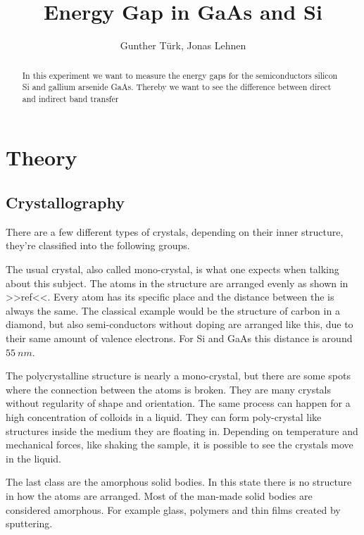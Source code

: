 \documentclass[]{article}
\title{Energy Gap in GaAs and Si}
\author{Gunther T\"urk, Jonas Lehnen}
\begin{document}
\maketitle
\begin{abstract}
In this experiment we want to measure the energy gaps for the semiconductors silicon Si and gallium arsenide GaAs. Thereby we want to see the difference between direct and indirect band transfer

\end{abstract}

\tableofcontents


\section{Theory}
\subsection{Crystallography}
There are a few different types of crystals, depending on their inner structure, they're classified into the following groups. 

The usual crystal, also called mono-crystal, is what one expects when talking about this subject. The atoms in the structure are arranged evenly as shown in >>ref<<. Every atom has its specific place and the distance between the is always the same. The classical example would be the structure of carbon in a diamond, but also semi-conductors without doping are arranged like this, due to their same amount of valence electrons. For Si and GaAs this distance is around $55\ nm$.

The polycrystalline structure is nearly a mono-crystal, but there are some spots where the connection between the atoms is broken. They are many crystals without regularity of shape and orientation. The same process can happen for a high concentration of colloids in a liquid. They can form poly-crystal like structures inside the medium they are floating in. Depending on temperature and mechanical forces, like shaking the sample, it is possible to see the crystals move in the liquid.


The last class are the amorphous solid bodies. In this state there is no structure in how the atoms are arranged. Most of the man-made solid bodies are considered amorphous. For example glass, polymers and thin films created by sputtering. 
\end{document}
